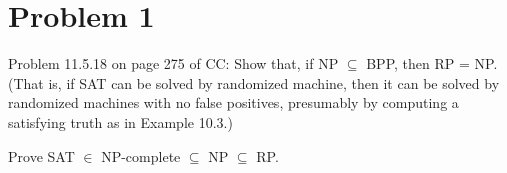 \documentclass[twoside,11pt]{homework}
\date{\today} %
\begin{document}
\maketitle

\section*{Problem 1}

\begin{prob}
  Problem 11.5.18 on page 275 of CC:
  Show that, if NP $\subseteq$ BPP, then RP = NP.
  (That is, if SAT can be solved by randomized machine, then it can be solved by
  randomized machines with no false positives, presumably by computing a
  satisfying truth as in Example 10.3.)
\end{prob}

\begin{goal}
  Prove SAT $\in$ NP-complete $\subseteq$ NP $\subseteq$ RP.
\end{goal}
\end{document}
